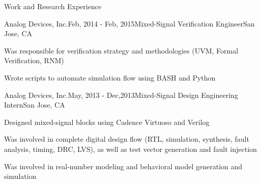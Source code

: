 \begin{rSection} {Work and Research Experience}
\begin{rSubsection}{Analog Devices, Inc.}{Feb, 2014 - Feb, 2015}{Mixed-Signal Verification Engineer}{San Jose, CA}
  \item Was responsible for verification strategy and methodologies (UVM, Formal Verification, RNM)
  \item Wrote scripts to automate simulation flow using BASH and Python
  \end{rSubsection}
  \begin{rSubsection}{Analog Devices, Inc.}{May, 2013 - Dec,2013}{Mixed-Signal Design Engineering Intern}{San Jose, CA}
  \item Designed mixed-signal blocks using Cadence Virtuoso and Verilog
  \item Was involved in complete digital design flow (RTL, simulation, synthesis, fault analysis, timing, DRC, LVS), as well as test vector generation and fault injection
  \item Was involved in real-number modeling and behavioral model generation and simulation
  \end{rSubsection}
\end{rSection}
